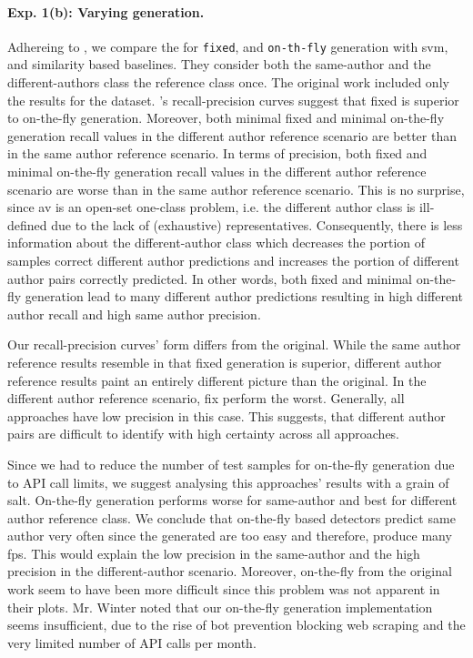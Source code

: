 \paragraph{Exp. 1(b): Varying \imp{} generation.}

Adhereing to \citet{koppel_determining_2014}, we compare the \impAppr{} for \texttt{fixed}, and \texttt{on-th-fly} \imp{} generation with \ac{svm}, and similarity based baselines.
They consider both the same-author and the different-authors class the reference class once.
The original work included only the results for the \dataBlog{} dataset.
\citet{koppel_determining_2014}'s recall-precision curves suggest that fixed is superior to on-the-fly \imp{} generation.
Moreover, both minimal fixed and minimal on-the-fly \imp{} generation recall values in the different author reference scenario are better than in the same author reference scenario.
In terms of precision, both fixed and minimal on-the-fly \imp{} generation recall values in the different author reference scenario are worse than in the same author reference scenario. %
This is no surprise, since \ac{av} is an open-set one-class problem, i.e. the different author class is ill-defined due to the lack of (exhaustive) representatives.
Consequently, there is less information about the different-author class which decreases the portion of samples correct different author predictions and increases the portion of different author pairs correctly predicted.
In other words, both fixed and minimal on-the-fly \imp{} generation lead to many different author predictions resulting in high different author recall and high same author precision.

Our recall-precision curves' form differs from the original.
While the same author reference results resemble \citet{koppel_determining_2014} in that fixed \imp{} generation is superior, different author reference results paint an entirely different picture than the original.
In the different author reference scenario, fix \imps{} perform the worst. 
Generally, all approaches have low precision in this case.
This suggests, that different author pairs are difficult to identify with high certainty across all approaches. 

Since we had to reduce the number of test samples for on-the-fly \imp{} generation due to API call limits, we suggest analysing this approaches' results with a grain of salt.
On-the-fly \imp{} generation performs worse for same-author and best for different author reference class.
We conclude that on-the-fly based detectors predict same author very often since the generated \imps{} are too easy and therefore, produce many \acp{fp}.
This would explain the low precision in the same-author and the high precision in the different-author scenario.
Moreover, on-the-fly \imps{} from the original work seem to have been more difficult since this problem was not apparent in their plots.
Mr. Winter noted that our on-the-fly \imp{} generation implementation seems insufficient, due to the rise of bot prevention blocking web scraping and the very limited number of API calls per month.




